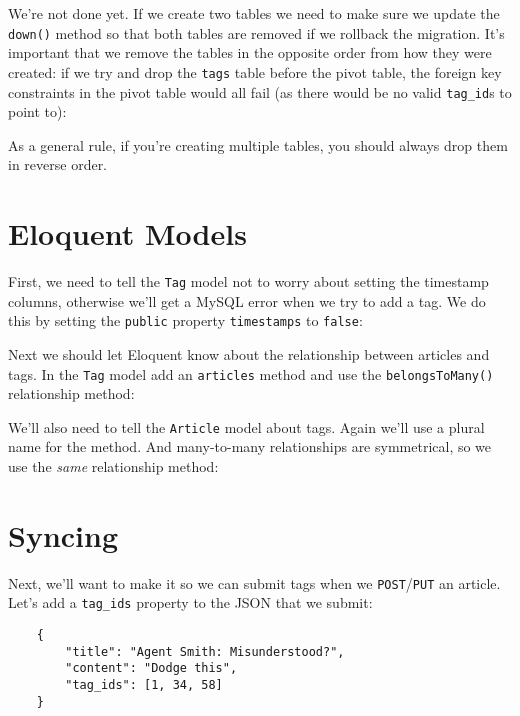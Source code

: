 We're not done yet. If we create two tables we need to make sure we update the \texttt{down()} method so that both tables are removed if we rollback the migration. It's important that we remove the tables in the opposite order from how they were created: if we try and drop the \texttt{tags} table before the pivot table, the foreign key constraints in the pivot table would all fail (as there would be no valid \texttt{tag\_id}s to point to):


As a general rule, if you're creating multiple tables, you should always drop them in reverse order.


\section{Eloquent Models}

First, we need to tell the \texttt{Tag} model not to worry about setting the timestamp columns, otherwise we'll get a MySQL error when we try to add a tag. We do this by setting the \texttt{public} property \texttt{timestamps} to \texttt{false}:


Next we should let Eloquent know about the relationship between articles and tags. In the \texttt{Tag} model add an \texttt{articles} method and use the \texttt{belongsToMany()} relationship method:


We'll also need to tell the \texttt{Article} model about tags. Again we'll use a plural name for the method. And many-to-many relationships are symmetrical, so we use the \textit{same} relationship method:



\pagebreak

\section{Syncing}

Next, we'll want to make it so we can submit tags when we \texttt{POST}/\texttt{PUT} an article. Let's add a \texttt{tag\_ids} property to the JSON that we submit:

\begin{verbatim}
    {
        "title": "Agent Smith: Misunderstood?",
        "content": "Dodge this",
        "tag_ids": [1, 34, 58]
    }
\end{verbatim}

